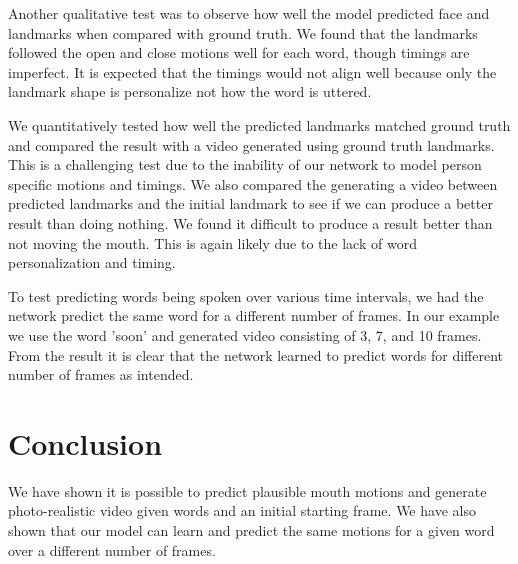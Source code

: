 \documentclass[10pt,twocolumn,letterpaper]{article}
\begin{document}
 Another qualitative test was to observe how well the model predicted face and landmarks when compared with ground truth. We found that the landmarks followed the open and close motions well for each word, though timings are imperfect. It is expected that the timings would not align well because only the landmark shape is personalize not how the word is uttered. 
 
 We quantitatively tested how well the predicted landmarks matched ground truth and compared the result with a video generated using ground truth landmarks. This is a challenging test due to the inability of our network to model person specific motions and timings. We also compared the generating a video between predicted landmarks and the initial landmark to see if we can produce a better result than doing nothing. We found it difficult to produce a result better than not moving the mouth. This is again likely due to the lack of word personalization and timing.
 
 To test predicting words being spoken over various time intervals, we had the network predict the same word for a different number of frames. In our example we use the word 'soon' and generated video consisting of 3, 7, and 10 frames. From the result it is clear that the network learned to predict words for different number of frames as intended.
 
\section{Conclusion}
We have shown it is possible to predict plausible mouth motions and generate photo-realistic video given words and an initial starting frame. We have also shown that our model can learn and predict the same motions for a given word over a different number of frames.  

{\small


}
\end{document}
